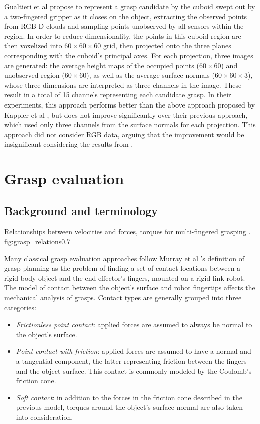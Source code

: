 Gualtieri et al \cite{Gualtieri2016} propose to represent a grasp candidate by the cuboid swept out by a two-fingered
gripper as it closes on the object, extracting the observed points from RGB-D clouds and sampling points unobserved by
all sensors within the region. In order to reduce dimensionality, the points in this cuboid region are then voxelized
into $60 \times 60 \times 60$ grid, then projected onto the three planes corresponding with the cuboid's principal axes.
For each projection, three images are generated: the average height maps of the occupied points ($60 \times 60$) and
unobserved region ($60 \times 60$), as well as the average surface normals ($60 \times 60 \times 3$), whose three
dimensions are interpreted as three channels in the image. These result in a total of 15 channels representing each
candidate grasp. In their experiments, this approach performs better than the above approach proposed by Kappler et al
\cite{Kappler2015}, but does not improve significantly over their previous approach, which used only three channels from
the surface normals for each projection. This approach did not consider RGB data, arguing that the improvement would be
insignificant considering the results from \cite{lenz2015}.


\section{Grasp evaluation}

\subsection{Background and terminology}
             {Relationships between velocities and forces, torques for multi-fingered grasping \cite{Roa2015}.}
             {fig:grasp_relations}{0.7\textwidth}

Many classical grasp evaluation approaches follow Murray et al \cite{Murray1994}'s definition of grasp planning as the
problem of finding a set of contact locations between a rigid-body object and the end-effector's fingers, mounted on a
rigid-link robot. The model of contact between the object's surface and robot fingertips affects the mechanical analysis
of grasps. Contact types are generally grouped into three categories:
\begin{itemize}
    \item \emph{Frictionless point contact}: applied forces are assumed to always be normal to the object's surface.
    \item \emph{Point contact with friction}: applied forces are assumed to have a normal and a tangential component,
    the latter representing friction between the fingers and the object surface. This contact is commonly modeled by the
    Coulomb's friction cone.
    \item \emph{Soft contact}: in addition to the forces in the friction cone described in the previous model, torques
    around the object's surface normal are also taken into consideration.
\end{itemize}

